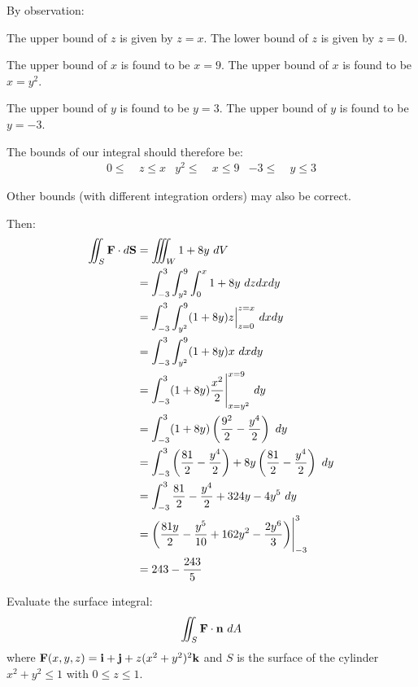 \begin{solution}
    By observation:
    
    The upper bound of \(z\) is given by \(z = x\). 
    The lower bound of \(z\) is given by \(z = 0\). 
    
    The upper bound of \(x\) is found to be \(x = 9\). 
    The upper bound of \(x\) is found to be \(x = y^2\).
    
    The upper bound of \(y\) is found to be \(y = 3\).
    The upper bound of \(y\) is found to be \(y = -3\).
    
    The bounds of our integral should therefore be:
    \begin{align}
        0 \leq & \ z \leq x & y^2 \leq & \ x \leq 9 & -3 \leq & \ y \leq 3
    \end{align}
    
    Other bounds (with different integration orders) may also be correct.
    
    Then:
    \begin{align*}
        \iint_{S} \vb{F} \cdot d\vb{S} &= \iiint_W 1 + 8y \ dV \\
        &= \int_{-3}^3 \int_{y^2}^9 \int_0^x 1 + 8y \ dzdxdy \\
        &= \int_{-3}^3 \int_{y^2}^9 (1 + 8y) z \Big|_{z = 0}^{z = x} \ dxdy \\
        &= \int_{-3}^3 \int_{y^2}^9 (1 + 8y) x \ dxdy \\
        &= \int_{-3}^3 (1 + 8y) \frac{x^2}{2} \Biggr|_{x = y^2}^{x = 9} \ dy \\
        &= \int_{-3}^3 (1 + 8y) \left(\frac{9^2}{2} - \frac{y^4}{2}\right) \ dy \\
        &= \int_{-3}^3 \left(\frac{81}{2} - \frac{y^4}{2}\right) + 8y\left(\frac{81}{2} - \frac{y^4}{2}\right) \ dy \\
        &= \int_{-3}^3 \frac{81}{2} - \frac{y^4}{2} + 324y - 4y^5 \ dy \\
        &= \left(\frac{81y}{2} - \frac{y^5}{10} + 162y^2 - \frac{2y^6}{3}\right) \Biggr|_{-3}^3 \\
        &= 243 - \frac{243}{5}
    \end{align*}
\end{solution}

\begin{tcolorbox}[
        title={Problem 16},
        valign=center,
        nobeforeafter,
        colframe=gray!95!black
    ]
    Evaluate the surface integral:
    \begin{align}
        \iint_{S} \vb{F} \cdot \vb{n} \ dA
    \end{align}
    where \(\vb{F}(x, y, z) = \vb{i} + \vb{j} + z(x^2 + y^2)^2\vb{k}\) and \(S\) is the surface of the cylinder \(x^2 + y^2 \leq 1\) with \(0 \leq z \leq 1\).
\end{tcolorbox}

